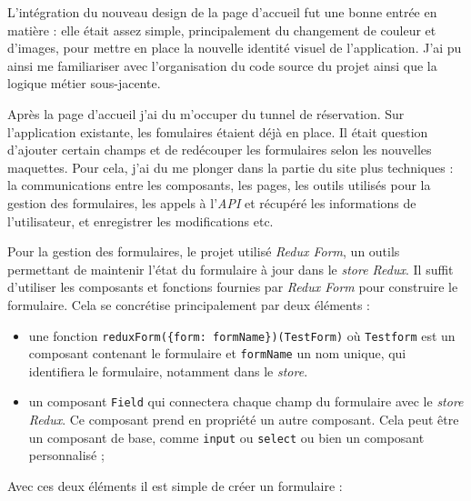 \documentclass[12pt,a4paper]{article}
\providecommand{\tightlist}{%
  \setlength{\itemsep}{0pt}\setlength{\parskip}{0pt}}
\begin{document}
  \bigskip

  L'intégration du nouveau design de la page d'accueil fut une bonne
  entrée en matière : elle était assez simple, principalement du
  changement de couleur et d'images, pour mettre en place la nouvelle
  identité visuel de l'application. J'ai pu ainsi me familiariser avec
  l'organisation du code source du projet ainsi que la logique métier
  sous-jacente.

  \bigskip

  Après la page d'accueil j'ai du m'occuper du tunnel de réservation. Sur
  l'application existante, les fomulaires étaient déjà en place. Il était
  question d'ajouter certain champs et de redécouper les formulaires selon
  les nouvelles maquettes. Pour cela, j'ai du me plonger dans la partie du
  site plus techniques : la communications entre les composants, les
  pages, les outils utilisés pour la gestion des formulaires, les appels à
  l'\emph{API} et récupéré les informations de l'utilisateur, et
  enregistrer les modifications etc.

  \bigskip

  Pour la gestion des formulaires, le projet utilisé \emph{Redux Form}, un
  outils permettant de maintenir l'état du formulaire à jour dans le
  \emph{store Redux}. Il suffit d'utiliser les composants et fonctions
  fournies par \emph{Redux Form} pour construire le formulaire. Cela se
  concrétise principalement par deux éléments :

  \begin{itemize}
  \tightlist
  \item
    une fonction
    \texttt{reduxForm(\{form:\ \textquotesingle{}formName\textquotesingle{}\})(TestForm)}
    où \texttt{Testform} est un composant contenant le formulaire et
    \texttt{formName} un nom unique, qui identifiera le formulaire,
    notamment dans le \emph{store}.
  \item
    un composant \texttt{Field} qui connectera chaque champ du formulaire
    avec le \emph{store Redux}. Ce composant prend en propriété un autre
    composant. Cela peut être un composant de base, comme \texttt{input}
    ou \texttt{select} ou bien un composant personnalisé ;
  \end{itemize}

  Avec ces deux éléments il est simple de créer un formulaire :
\end{document}
